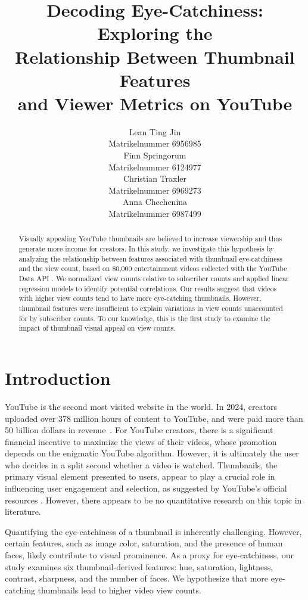 \documentclass{article}
\title{Decoding Eye-Catchiness: Exploring the\\Relationship Between Thumbnail Features\\and Viewer Metrics on YouTube}
\author{%
  Lean Ting Jin\\
  Matrikelnummer 6956985\\
  \And
  Finn Springorum\\
  Matrikelnummer 6124977\\
  \AND
  Christian Traxler\\
  Matrikelnummer 6969273\\
  \And
  Anna Chechenina\\
  Matrikelnummer 6987499\\
}
\begin{document}
\maketitle

\begin{abstract}
Visually appealing YouTube thumbnails are believed to increase viewership and thus generate more income for creators. In this study, we investigate this hypothesis by analyzing the relationship between features associated with thumbnail eye-catchiness and the view count, based on 80,000 entertainment videos collected with the YouTube Data API \cite{youtubeapi}. We normalized view counts relative to subscriber counts and applied linear regression models to identify potential correlations. Our results suggest that videos with higher view counts tend to have more eye-catching thumbnails. However, thumbnail features were insufficient to explain variations in view counts unaccounted for by subscriber counts. To our knowledge, this is the first study to examine the impact of thumbnail visual appeal on view counts.
\end{abstract}

\section{Introduction}
YouTube is the second most visited website in the world. In 2024, creators uploaded over 378 million hours of content to YouTube, and were paid more than 50 billion dollars in revenue~\cite{youtube-stats}. For YouTube creators, there is a significant financial incentive to maximize the views of their videos, whose promotion depends on the enigmatic YouTube algorithm. However, it is ultimately the user who decides in a split second whether a video is watched. Thumbnails, the primary visual element presented to users, appear to play a crucial role in influencing user engagement and selection, as suggested by YouTube's official resources \cite{YouTubeThumbnail}. However, there appears to be no quantitative research on this topic in literature.

Quantifying the eye-catchiness of a thumbnail is inherently challenging. However, certain features, such as image color, saturation, and the presence of human faces, likely contribute to visual prominence. As a proxy for eye-catchiness, our study examines six thumbnail-derived features: hue, saturation, lightness, contrast, sharpness, and the number of faces. We hypothesize that more eye-catching thumbnails lead to higher video view counts.
\end{document}
